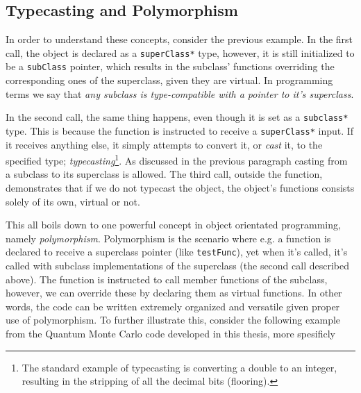\subsection*{Typecasting and Polymorphism}
\label{sec:typeCastPoly}

In order to understand these concepts, consider the previous example. In the first call, the object is declared as a \verb+superClass*+ type, however, it is still initialized to be a \verb+subClass+ pointer, which results in the subclass' functions overriding the corresponding ones of the superclass, given they are virtual. In programming terms we say that \textit{any subclass is type-compatible with a pointer to it's superclass}.%

In the second call, the same thing happens, even though it is set as a \verb+subclass*+ type. This is because the function is instructed to receive a \verb+superClass*+ input. If it receives anything else, it simply attempts to convert it, or \textit{cast} it, to the specified type; \textit{typecasting}\footnote{The standard example of typecasting is converting a double to an integer, resulting in the stripping of all the decimal bits (flooring).}. As discussed in the previous paragraph casting from a subclass to its superclass is allowed. The third call, outside the function, demonstrates that if we do not typecast the object, the object's functions consists solely of its own, virtual or not.

This all boils down to one powerful concept in object orientated programming, namely \textit{polymorphism}. Polymorphism is the scenario where e.g. a function is declared to receive a superclass pointer (like \verb+testFunc+), yet when it's called, it's called with subclass implementations of the superclass (the second call described above). The function is instructed to call member functions of the subclass, however, we can override these by declaring them as virtual functions. In other words, the code can be written extremely organized and versatile given proper use of polymorphism. To further illustrate this, consider the following example from the Quantum Monte Carlo code developed in this thesis, more spesificly 

